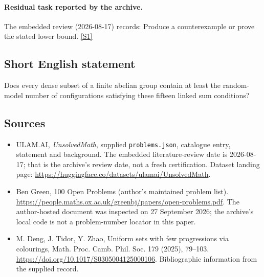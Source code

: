 \documentclass[11pt,a4paper]{article}
\newcommand{\sref}[2]{\hyperlink{source:#1:#2}{[S#2]}}
\begin{document}
\paragraph{Residual task reported by the archive.}

The embedded review (2026-08-17) records: Produce a counterexample or prove the stated lower bound. \sref{statement}{1}

\subsection{Short English statement}

Does every dense subset of a finite abelian group contain at least the random-model number of configurations satisfying these fifteen linked sum conditions?

\subsection{Sources}

{\small

\begin{itemize}

\item[\hypertarget{source:statement:1}{S1}] ULAM.AI, \emph{UnsolvedMath}, supplied \texttt{problems.json}, catalogue entry, statement and background. The embedded literature-review date is 2026-08-17; that is the archive’s review date, not a fresh certification. Dataset landing page: \url{https://huggingface.co/datasets/ulamai/UnsolvedMath}.

\item[\hypertarget{source:statement:2}{S2}] Ben Green, 100 Open Problems (author’s maintained problem list). \url{https://people.maths.ox.ac.uk/greenbj/papers/open-problems.pdf}. The author-hosted document was inspected on 27 September 2026; the archive’s local code is not a problem-number locator in this paper.

\item[\hypertarget{source:statement:3}{S3}] M. Deng, J. Tidor, Y. Zhao, Uniform sets with few progressions via colourings, Math. Proc. Camb. Phil. Soc. 179 (2025), 79--103. \url{https://doi.org/10.1017/S0305004125000106}. Bibliographic information from the supplied record.

\end{itemize}

}

\label{end:statement}
\end{document}
